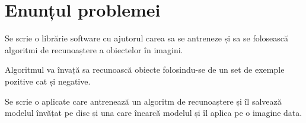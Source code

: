 \section{Enunțul problemei}
Se scrie o librărie software cu ajutorul carea sa se antreneze și sa se folosească algoritmi de recunoaștere a obiectelor în imagini.

Algoritmul va învață sa recunoască obiecte folosindu-se de un set de exemple pozitive cat și negative.

Se scrie o aplicate care antrenează un algoritm de recunoaștere și îl salvează modelul învățat pe disc și una care încarcă modelul și îl aplica pe o imagine data.

